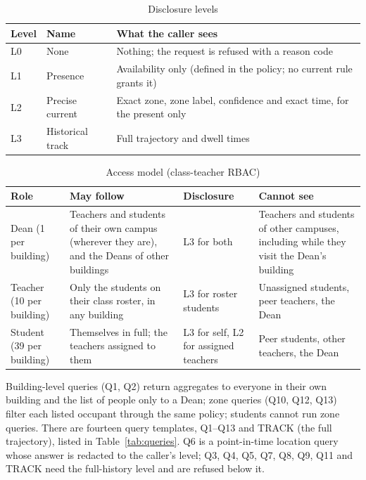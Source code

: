 \documentclass[12pt,a4paper,oneside]{report}
\begin{document}
\begin{table}[htbp]
\centering
\caption{Disclosure levels}\label{tab:levels}
{\small\setlength{\tabcolsep}{4pt}\renewcommand{\arraystretch}{1.2}
\begin{tabular}{|p{1.17cm}|p{4.11cm}|p{9.00cm}|}\hline
\textbf{Level} & \textbf{Name} & \textbf{What the caller sees}\\\hline
L0 & None & Nothing; the request is refused with a reason code\\\hline
L1 & Presence & Availability only (defined in the policy; no current rule grants it)\\\hline
L2 & Precise current & Exact zone, zone label, confidence and exact time, for the present only\\\hline
L3 & Historical track & Full trajectory and dwell times\\\hline
\end{tabular}}
\end{table}

\begin{table}[htbp]
\centering
\caption{Access model (class-teacher RBAC)}\label{tab:access}
{\small\setlength{\tabcolsep}{4pt}\renewcommand{\arraystretch}{1.2}
\begin{tabular}{|p{2.49cm}|p{5.36cm}|p{2.87cm}|p{3.25cm}|}\hline
\textbf{Role} & \textbf{May follow} & \textbf{Disclosure} & \textbf{Cannot see}\\\hline
Dean (1 per building) & Teachers and students of their own campus (wherever they are), and the Deans of other buildings & L3 for both & Teachers and students of other campuses, including while they visit the Dean's building\\\hline
Teacher (10 per building) & Only the students on their class roster, in any building & L3 for roster students & Unassigned students, peer teachers, the Dean\\\hline
Student (39 per building) & Themselves in full; the teachers assigned to them & L3 for self, L2 for assigned teachers & Peer students, other teachers, the Dean\\\hline
\end{tabular}}
\end{table}

Building-level queries (Q1, Q2) return aggregates to everyone in their own building and the list of people only to a Dean; zone queries (Q10, Q12, Q13) filter each listed occupant through the same policy; students cannot run zone queries. There are fourteen query templates, Q1--Q13 and TRACK (the full trajectory), listed in Table~\ref{tab:queries}. Q6 is a point-in-time location query whose answer is redacted to the caller's level; Q3, Q4, Q5, Q7, Q8, Q9, Q11 and TRACK need the full-history level and are refused below it.
\end{document}
